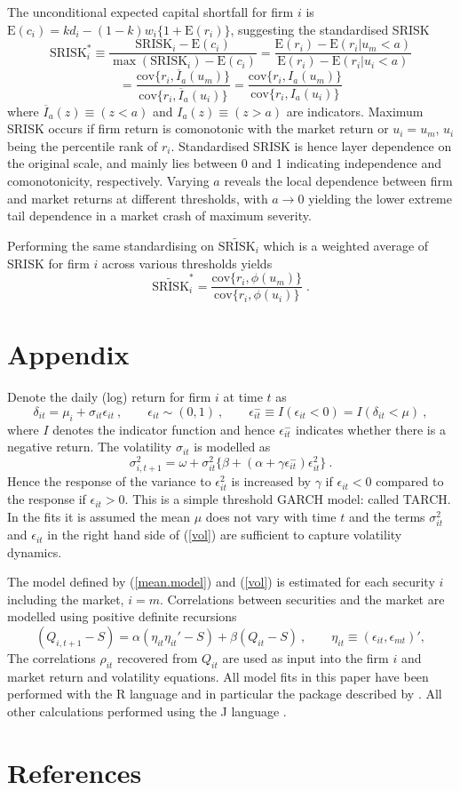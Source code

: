 \documentclass[authoryear]{elsarticle}
\newcommand{\E}{\mathrm{E}}
\newcommand{\cov}{\mathrm{cov}}
\newcommand{\eps}{\epsilon}
\newcommand{\eref}[1]{(\ref{#1})}
\newcommand{\cq}{\ , \qquad}
\newcommand{\be}[1]{\begin{equation}\label{#1}}
\newcommand{\ee}{\end{equation}}
\begin{document}
The unconditional expected capital shortfall for firm $i$ is $\E(c_i)=kd_i-(1-k)w_i\{1+\E(r_i)\}$, suggesting the standardised SRISK
$$
\mathrm{SRISK}_i^* \equiv \frac{\mathrm{SRISK}_i-\E(c_i)}{\max(\mathrm{SRISK}_i)-\E(c_i)}
=\frac{\E(r_i)-\E(r_i|u_m<a)}{\E(r_i)-\E(r_i|u_i<a)}
$$
$$
=\frac{\cov\{r_i,\overline{I}_a(u_m)\}}{\cov\{r_i,\overline{I}_a(u_i)\}}
=\frac{\cov\{r_i,I_a(u_m)\}}{\cov\{r_i,I_a(u_i)\}} 
$$
where $\overline{I}_a(z)\equiv (z<a)$ and $I_a(z)\equiv (z>a)$ are indicators. Maximum SRISK occurs if firm return is comonotonic with the market return or $u_i=u_m$, $u_i$ being the percentile rank of $r_i$. Standardised SRISK is hence layer dependence on the original scale, and mainly lies between 0 and 1 indicating independence and comonotonicity, respectively. Varying $a$ reveals the local dependence between firm and market returns at different thresholds, with $a\rightarrow 0$ yielding the lower extreme tail dependence in a market crash of maximum severity.

Performing the same standardising on $\widetilde{\mathrm{SRISK}}_i$ which is a weighted average of SRISK for firm $i$ across various thresholds yields
$$
\widetilde{\mathrm{SRISK}}_i^* = \frac{\cov\{r_i,\phi(u_m)\}}{\cov\{r_i,\phi(u_i)\}}   \;.
$$




\section*{Appendix}\label{garchdcc}

Denote the daily (log) return for firm $i$ at time $t$ as
\newcommand{\vareps}{\varepsilon}
\be{mean.model}
\delta_{it}=\mu_i+\sigma_{it}\eps_{it}\cq \eps_{it}\sim (0,1)\cq  \eps^-_{it}\equiv I(\eps_{it}<0)=I(\delta_{it}<\mu)\ ,
\ee
where $I$ denotes the indicator function and hence $\eps_{it}^-$ indicates whether there is a negative return.
The volatility $\sigma_{it}$ is modelled as
\be{vol}
\sigma_{i,t+1}^2 = \omega+ \sigma^2_{it}\{\beta+(\alpha+\gamma \eps^-_{it})\eps_{it}^2\} \ .
\ee
Hence the response of the variance to $\eps_{it}^2$  is increased by $\gamma$   if $\eps_{it}<0$ compared to the response if $\eps_{it}>0$.  This is a simple threshold GARCH model:  called TARCH.   In the fits it is assumed the mean $\mu$ does not vary with time $t$ and the terms  $\sigma_{it}^2$ and $\eps_{it}$ in the right hand side of \eref{vol} are sufficient to capture volatility dynamics. 

The model defined by \eref{mean.model} and \eref{vol} is estimated  for each security $i$ including the market,  $i=m$.   Correlations between securities and the market are  modelled using  positive definite recursions   \citep{engle2002dynamic}
$$
(Q_{i,t+1}-S) = \alpha (\eta_{it}\eta_{it}'-S) + \beta (Q_{it}-S)\cq \eta_{it}\equiv(\eps_{it},\eps_{mt})' ,
$$
The correlations $\rho_{it}$ recovered from $Q_{it}$ are used as input into the firm $i$ and market return and volatility equations.
All model fits in this paper have been performed with the R language \citep{R-Development-Core-Team:2008aa} and in particular the package described by \cite{ghalanos2012rmgarch}.  All other calculations performed using the J language \citep{iverson2003j}.



\section*{References}

\end{document}
